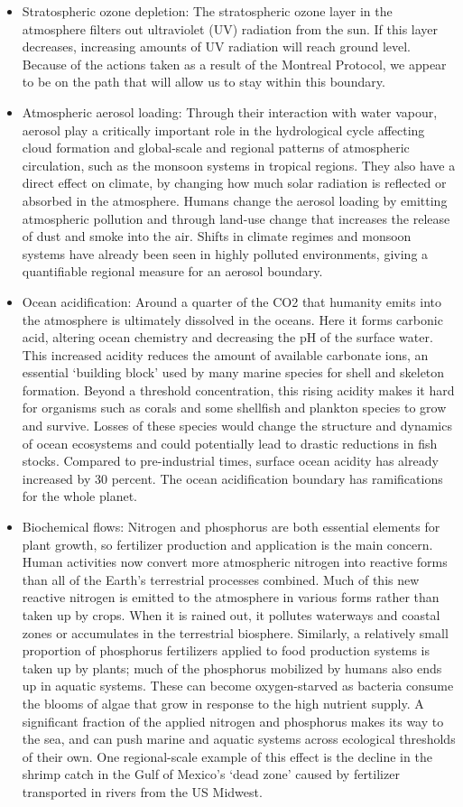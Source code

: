 \documentclass[
  12pt,
  oneside]{book}
\begin{document}
\begin{itemize}
\item
  Stratospheric ozone depletion: The stratospheric ozone layer in the atmosphere filters out ultraviolet (UV) radiation from the sun. If this layer decreases, increasing amounts of UV radiation will reach ground level. Because of the actions taken as a result of the Montreal Protocol, we appear to be on the path that will allow us to stay within this boundary.
\item
  Atmospheric aerosol loading: Through their interaction with water vapour, aerosol play a critically important role in the hydrological cycle affecting cloud formation and global-scale and regional patterns of atmospheric circulation, such as the monsoon systems in tropical regions. They also have a direct effect on climate, by changing how much solar radiation is reflected or absorbed in the atmosphere. Humans change the aerosol loading by emitting atmospheric pollution and through land-use change that increases the release of dust and smoke into the air. Shifts in climate regimes and monsoon systems have already been seen in highly polluted environments, giving a quantifiable regional measure for an aerosol boundary.
\item
  Ocean acidification: Around a quarter of the CO2 that humanity emits into the atmosphere is ultimately dissolved in the oceans. Here it forms carbonic acid, altering ocean chemistry and decreasing the pH of the surface water. This increased acidity reduces the amount of available carbonate ions, an essential `building block' used by many marine species for shell and skeleton formation. Beyond a threshold concentration, this rising acidity makes it hard for organisms such as corals and some shellfish and plankton species to grow and survive. Losses of these species would change the structure and dynamics of ocean ecosystems and could potentially lead to drastic reductions in fish stocks. Compared to pre-industrial times, surface ocean acidity has already increased by 30 percent. The ocean acidification boundary has ramifications for the whole planet.
\item
  Biochemical flows: Nitrogen and phosphorus are both essential elements for plant growth, so fertilizer production and application is the main concern. Human activities now convert more atmospheric nitrogen into reactive forms than all of the Earth's terrestrial processes combined. Much of this new reactive nitrogen is emitted to the atmosphere in various forms rather than taken up by crops. When it is rained out, it pollutes waterways and coastal zones or accumulates in the terrestrial biosphere. Similarly, a relatively small proportion of phosphorus fertilizers applied to food production systems is taken up by plants; much of the phosphorus mobilized by humans also ends up in aquatic systems. These can become oxygen-starved as bacteria consume the blooms of algae that grow in response to the high nutrient supply. A significant fraction of the applied nitrogen and phosphorus makes its way to the sea, and can push marine and aquatic systems across ecological thresholds of their own. One regional-scale example of this effect is the decline in the shrimp catch in the Gulf of Mexico's `dead zone' caused by fertilizer transported in rivers from the US Midwest.

\end{itemize}
\end{document}
